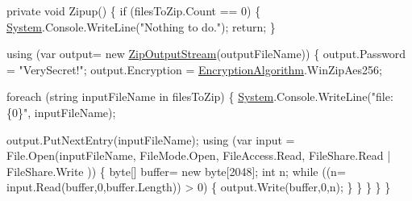\begin{DoxyCode}
\textcolor{keyword}{private} \textcolor{keywordtype}{void} Zipup()
\{
    \textcolor{keywordflow}{if} (filesToZip.Count == 0)
    \{
        \mbox{\hyperlink{namespace_system}{System}}.Console.WriteLine(\textcolor{stringliteral}{"Nothing to do."});
        \textcolor{keywordflow}{return};
    \}

    \textcolor{keyword}{using} (var output= \textcolor{keyword}{new} \mbox{\hyperlink{class_super_tiled2_unity_1_1_ionic_1_1_zip_1_1_zip_output_stream_ae484108e008d5822cd7e140bcf44e9fe}{ZipOutputStream}}(outputFileName))
    \{
        output.Password = \textcolor{stringliteral}{"VerySecret!"};
        output.Encryption = \mbox{\hyperlink{namespace_super_tiled2_unity_1_1_ionic_1_1_zip_aa3f4e8aa12ef827ac72177a49b4e28e6}{EncryptionAlgorithm}}.WinZipAes256;

        \textcolor{keywordflow}{foreach} (\textcolor{keywordtype}{string} inputFileName \textcolor{keywordflow}{in} filesToZip)
        \{
            \mbox{\hyperlink{namespace_system}{System}}.Console.WriteLine(\textcolor{stringliteral}{"file: \{0\}"}, inputFileName);

            output.PutNextEntry(inputFileName);
            \textcolor{keyword}{using} (var input = File.Open(inputFileName, FileMode.Open, FileAccess.Read,
                                         FileShare.Read | FileShare.Write ))
            \{
                byte[] buffer= \textcolor{keyword}{new} byte[2048];
                \textcolor{keywordtype}{int} n;
                \textcolor{keywordflow}{while} ((n= input.Read(buffer,0,buffer.Length)) > 0)
                \{
                    output.Write(buffer,0,n);
                \}
            \}
        \}
    \}
\}
\end{DoxyCode}



